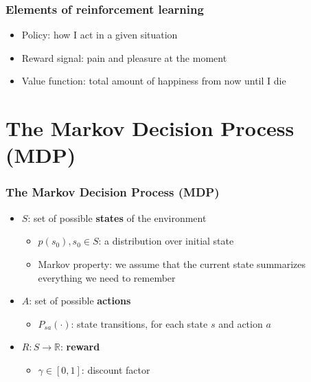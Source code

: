 \documentclass{beamer}
\begin{document}
\begin{frame}
  \frametitle{Elements of reinforcement learning}
  \begin{itemize}
    \item Policy: how I act in a given situation
    \item Reward signal: pain and pleasure at the moment
    \item Value function: total amount of happiness from now until I die
  \end{itemize}
\end{frame}


\section{The Markov Decision Process (MDP)}

\begin{frame}
  \frametitle{The Markov Decision Process (MDP)}
  \begin{itemize}
    \item $S$: set of possible \textbf{states} of the environment
    \begin{itemize}
      \item $p(s_0), s_0 \in S$: a distribution over initial state
      \item Markov property: we assume that the current state summarizes everything we need to remember
    \end{itemize}
    \item $A$: set of possible \textbf{actions}
    \begin{itemize}
      \item $P_{sa}(\cdot)$: state transitions, for each state $s$ and action $a$
    \end{itemize}
    \item $R: S \rightarrow \mathbb{R}$: \textbf{reward}
    \begin{itemize}
      \item $\gamma \in [0,1]$: discount factor
    \end{itemize}
  \end{itemize}
\end{frame}
\end{document}
